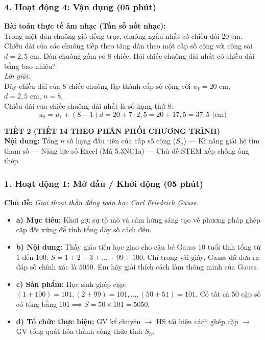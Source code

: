 \documentclass[12pt, a4paper]{article}
\begin{document}
\subsubsection*{4. Hoạt động 4: Vận dụng (05 phút)}
\textbf{Bài toán thực tế âm nhạc (Tần số nốt nhạc):}\\
Trong một dàn chuông gió đồng trục, chuông ngắn nhất có chiều dài $20\text{ cm}$. Chiều dài của các chuông tiếp theo tăng dần theo một cấp số cộng với công sai $d = 2{,}5\text{ cm}$. Dàn chuông gồm có $8$ chiếc. Hỏi chiếc chuông dài nhất có chiều dài bằng bao nhiêu?\\
\textit{Lời giải:}\\
Dãy chiều dài của $8$ chiếc chuông lập thành cấp số cộng với $u_1 = 20\text{ cm}$, $d = 2{,}5\text{ cm}$, $n = 8$.\\
Chiều dài của chiếc chuông dài nhất là số hạng thứ $8$:
$$u_8 = u_1 + (8 - 1)d = 20 + 7 \cdot 2{,}5 = 20 + 17{,}5 = 37{,}5\text{ (cm)}$$


\newpage


{\large \textbf{TIẾT 2 (TIẾT 14 THEO PHÂN PHỐI CHƯƠNG TRÌNH)}}\\[0.3em]
\textbf{Nội dung:} Tổng $n$ số hạng đầu tiên của cấp số cộng ($S_n$) --- Kĩ năng giải hệ tìm tham số --- Năng lực số Excel (Mã 5.3NC1a) --- Chủ đề STEM xếp chồng ống thép.


\subsubsection*{1. Hoạt động 1: Mở đầu / Khởi động (05 phút)}
\textbf{Chủ đề:} \textit{Giai thoại thần đồng toán học Carl Friedrich Gauss.}
\begin{itemize}
    \item \textbf{a) Mục tiêu:} Khơi gợi sự tò mò và cảm hứng sáng tạo về phương pháp ghép cặp đối xứng để tính tổng dãy số cách đều.
    \item \textbf{b) Nội dung:} Thầy giáo tiểu học giao cho cậu bé Gauss $10$ tuổi tính tổng từ $1$ đến $100$: $S = 1 + 2 + 3 + \dots + 99 + 100$.
    Chỉ trong vài giây, Gauss đã đưa ra đáp số chính xác là $5050$. Em hãy giải thích cách làm thông minh của Gauss.
    \item \textbf{c) Sản phẩm:} Học sinh ghép cặp: $(1 + 100) = 101, (2 + 99) = 101, \dots, (50 + 51) = 101$. Có tất cả $50$ cặp số có tổng bằng $101 \implies S = 50 \times 101 = 5050$.
    \item \textbf{d) Tổ chức thực hiện:} GV kể chuyện $\to$ HS tái hiện cách ghép cặp $\to$ GV tổng quát hóa thành công thức tính $S_n$.
\end{itemize}
\end{document}
